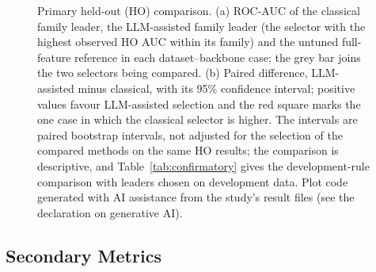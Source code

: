 \documentclass[final,5p,twocolumn]{elsarticle}
\begin{document}
\begin{figure}[htbp]
\caption{Primary held-out (HO) comparison. (a) ROC-AUC of the classical family leader, the LLM-assisted family leader (the selector with the highest observed HO AUC within its family) and the untuned full-feature reference in each dataset--backbone case; the grey bar joins the two selectors being compared. (b) Paired difference, LLM-assisted minus classical, with its 95\% confidence interval; positive values favour LLM-assisted selection and the red square marks the one case in which the classical selector is higher. The intervals are paired bootstrap intervals, not adjusted for the selection of the compared methods on the same HO results; the comparison is descriptive, and Table~\ref{tab:confirmatory} gives the development-rule comparison with leaders chosen on development data. Plot code generated with AI assistance from the study's result files (see the declaration on generative AI).}
\label{fig:primary}
\end{figure}

\subsection{Secondary Metrics}
\label{subsec:secondary_results}
\end{document}
